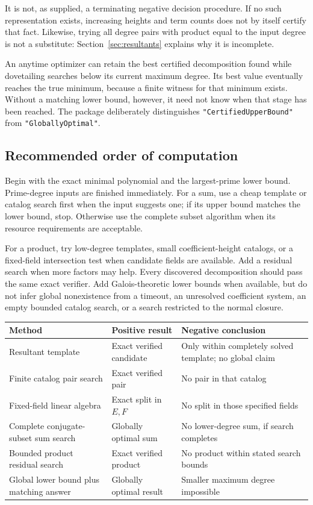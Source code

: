 \documentclass[11pt,letterpaper]{article}
\theoremstyle{definition}\newtheorem{definition}[theorem]{Definition}
\theoremstyle{remark}\newtheorem{remark}[theorem]{Remark}
\newcommand{\WL}[1]{\texttt{#1}}
\begin{document}
It is not, as supplied, a terminating negative decision procedure. If no such representation exists, increasing heights and term counts does not by itself certify that fact. Likewise, trying all degree pairs with product equal to the input degree is not a substitute: Section~\ref{sec:resultants} explains why it is incomplete.

An anytime optimizer can retain the best certified decomposition found while dovetailing searches below its current maximum degree. Its best value eventually reaches the true minimum, because a finite witness for that minimum exists. Without a matching lower bound, however, it need not know when that stage has been reached. The package deliberately distinguishes \WL{"CertifiedUpperBound"} from \WL{"GloballyOptimal"}.

\subsection{Recommended order of computation}
Begin with the exact minimal polynomial and the largest-prime lower bound. Prime-degree inputs are finished immediately. For a sum, use a cheap template or catalog search first when the input suggests one; if its upper bound matches the lower bound, stop. Otherwise use the complete subset algorithm when its resource requirements are acceptable.

For a product, try low-degree templates, small coefficient-height catalogs, or a fixed-field intersection test when candidate fields are available. Add a residual search when more factors may help. Every discovered decomposition should pass the same exact verifier. Add Galois-theoretic lower bounds when available, but do not infer global nonexistence from a timeout, an unresolved coefficient system, an empty bounded catalog search, or a search restricted to the normal closure.

\begin{center}
\small
\begin{tabular}{p{}p{}p{}}
\toprule
Method & Positive result & Negative conclusion\\
\midrule
Resultant template & Exact verified candidate & Only within completely solved template; no global claim\\
Finite catalog pair search & Exact verified pair & No pair in that catalog\\
Fixed-field linear algebra & Exact split in $E,F$ & No split in those specified fields\\
Complete conjugate-subset sum search & Globally optimal sum & No lower-degree sum, if search completes\\
Bounded product residual search & Exact verified product & No product within stated search bounds\\
Global lower bound plus matching answer & Globally optimal result & Smaller maximum degree impossible\\
\bottomrule
\end{tabular}
\end{center}
\end{document}

